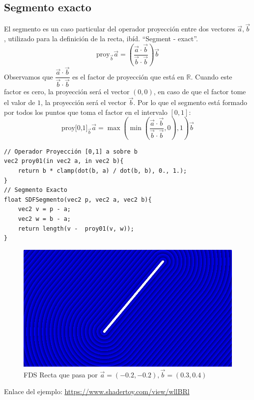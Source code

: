 \subsection{Segmento exacto}
El segmento es un caso particular del operador proyección entre dos vectores \(\Vec{a}, \Vec{b}\), utilizado para la definición de la recta, ibíd. \enquote{Segment - exact}. 
\[ \text{proy}_{\Vec{b}}\Vec{a}=\left(\dfrac{\Vec{a}\cdot \Vec{b}}{\Vec{b}\cdot \Vec{b}}\right)\Vec{b}\]
Observamos que \(\dfrac{\Vec{a}\cdot \Vec{b}}{\Vec{b}\cdot \Vec{b}}\) es el factor de proyección que está en \(\mathbb{R}\). Cuando este factor es cero, la proyección será el vector \((0,0)\), en caso de que el factor tome el valor de \(1\), la proyección será el vector \(\Vec{b}\). Por lo que el segmento está formado por todos los puntos que toma el factor en el intervalo \([0,1]\):
\[ \text{proy[0,1]}_{\Vec{b}}\Vec{a}=\max\left(\min\left(\dfrac{\Vec{a}\cdot \Vec{b}}{\Vec{b}\cdot \Vec{b}}, 0\right), 1\right)\Vec{b}\]

\begin{lstlisting}
// Operador Proyección [0,1] a sobre b
vec2 proy01(in vec2 a, in vec2 b){
    return b * clamp(dot(b, a) / dot(b, b), 0., 1.);
}
// Segmento Exacto
float SDFSegmento(vec2 p, vec2 a, vec2 b){
    vec2 v = p - a;
    vec2 w = b - a;
    return length(v -  proy01(v, w));
}
\end{lstlisting}

\begin{figure}[H]
  \centering
  \captionsetup{justification=centering}%
  \includegraphics[width=1.0\textwidth]{secciones/imagenes/sdf/2d/sdf_segmento.png}
  \caption{FDS Recta que pasa por \(\Vec{a}=(-0.2, -0.2), \Vec{b}=(0.3, 0.4)\)}
  \label{fig:segmento}
\end{figure}

Enlace del ejemplo: \url{https://www.shadertoy.com/view/wllBRl}

